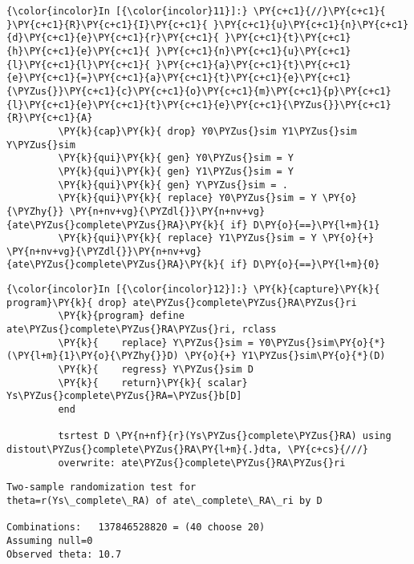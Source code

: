 \documentclass[11pt,notitlepage]{article}\usepackage[]{graphicx}\usepackage[]{color}
\makeatletter
\newenvironment{kframe}{%
 \def\at@end@of@kframe{}%
 \ifinner\ifhmode%
  \def\at@end@of@kframe{\end{minipage}}%
  \begin{minipage}{\columnwidth}%
 \fi\fi%
 \def\FrameCommand##1{\hskip\@totalleftmargin \hskip-\fboxsep
 \colorbox{shadecolor}{##1}\hskip-\fboxsep
     \hskip-\linewidth \hskip-\@totalleftmargin \hskip\columnwidth}%
 \MakeFramed {\advance\hsize-\width
   \@totalleftmargin\z@ \linewidth\hsize
   \@setminipage}}%
 {\par\unskip\endMakeFramed%
 \at@end@of@kframe}
\newenvironment{knitrout}{}{} %
\makeatother
\begin{document}
\begin{enumerate}[a)]
\begin{knitrout}
\begin{kframe}
    \begin{Verbatim}[commandchars=\\\{\}]
{\color{incolor}In [{\color{incolor}11}]:} \PY{c+c1}{//}\PY{c+c1}{ }\PY{c+c1}{R}\PY{c+c1}{I}\PY{c+c1}{ }\PY{c+c1}{u}\PY{c+c1}{n}\PY{c+c1}{d}\PY{c+c1}{e}\PY{c+c1}{r}\PY{c+c1}{ }\PY{c+c1}{t}\PY{c+c1}{h}\PY{c+c1}{e}\PY{c+c1}{ }\PY{c+c1}{n}\PY{c+c1}{u}\PY{c+c1}{l}\PY{c+c1}{l}\PY{c+c1}{ }\PY{c+c1}{a}\PY{c+c1}{t}\PY{c+c1}{e}\PY{c+c1}{=}\PY{c+c1}{a}\PY{c+c1}{t}\PY{c+c1}{e}\PY{c+c1}{\PYZus{}}\PY{c+c1}{c}\PY{c+c1}{o}\PY{c+c1}{m}\PY{c+c1}{p}\PY{c+c1}{l}\PY{c+c1}{e}\PY{c+c1}{t}\PY{c+c1}{e}\PY{c+c1}{\PYZus{}}\PY{c+c1}{R}\PY{c+c1}{A}
         \PY{k}{cap}\PY{k}{ drop} Y0\PYZus{}sim Y1\PYZus{}sim Y\PYZus{}sim
         \PY{k}{qui}\PY{k}{ gen} Y0\PYZus{}sim = Y
         \PY{k}{qui}\PY{k}{ gen} Y1\PYZus{}sim = Y
         \PY{k}{qui}\PY{k}{ gen} Y\PYZus{}sim = .
         \PY{k}{qui}\PY{k}{ replace} Y0\PYZus{}sim = Y \PY{o}{\PYZhy{}} \PY{n+nv+vg}{\PYZdl{}}\PY{n+nv+vg}{ate\PYZus{}complete\PYZus{}RA}\PY{k}{ if} D\PY{o}{==}\PY{l+m}{1}
         \PY{k}{qui}\PY{k}{ replace} Y1\PYZus{}sim = Y \PY{o}{+} \PY{n+nv+vg}{\PYZdl{}}\PY{n+nv+vg}{ate\PYZus{}complete\PYZus{}RA}\PY{k}{ if} D\PY{o}{==}\PY{l+m}{0}
\end{Verbatim}

    \begin{Verbatim}[commandchars=\\\{\}]
{\color{incolor}In [{\color{incolor}12}]:} \PY{k}{capture}\PY{k}{ program}\PY{k}{ drop} ate\PYZus{}complete\PYZus{}RA\PYZus{}ri
         \PY{k}{program} define ate\PYZus{}complete\PYZus{}RA\PYZus{}ri, rclass
         \PY{k}{	replace} Y\PYZus{}sim = Y0\PYZus{}sim\PY{o}{*}(\PY{l+m}{1}\PY{o}{\PYZhy{}}D) \PY{o}{+} Y1\PYZus{}sim\PY{o}{*}(D) 
         \PY{k}{	regress} Y\PYZus{}sim D 
         \PY{k}{    return}\PY{k}{ scalar} Ys\PYZus{}complete\PYZus{}RA=\PYZus{}b[D]	
         end
         
         tsrtest D \PY{n+nf}{r}(Ys\PYZus{}complete\PYZus{}RA) using distout\PYZus{}complete\PYZus{}RA\PY{l+m}{.}dta, \PY{c+cs}{///}
         overwrite: ate\PYZus{}complete\PYZus{}RA\PYZus{}ri
\end{Verbatim}

    \begin{Verbatim}[commandchars=\\\{\}]
Two-sample randomization test for 
theta=r(Ys\_complete\_RA) of ate\_complete\_RA\_ri by D

Combinations:   137846528820 = (40 choose 20)
Assuming null=0
Observed theta: 10.7


\end{Verbatim}
\end{kframe}
\end{knitrout}
\end{enumerate}
\end{document}

